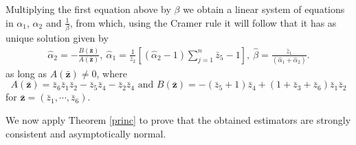 \documentclass[lineno]{biometrika}
\newcommand{\bs}{\boldsymbol}
\begin{document}
Multiplying the first equation above by $\beta$ we obtain a linear system of equations in $\alpha_1$, $\alpha_2$ and $\frac{1}{\beta}$, from which, using the Cramer rule it will follow that it has as unique solution given by
\begin{align*}
\hat{\alpha}_2 = -\frac{B(\bs{\bar{z}})}{A(\bs{\bar{z}})}, \
\hat{\alpha}_1 = \frac{1}{\bar{z}_2} \left[ (\hat{\alpha}_2 - 1) \sum_{j=1}^{n} \bar{z}_5 - 1 \right], \
\hat{\beta} = \frac{\bar{z}_1}{ (\hat{\alpha}_1 + \hat{\alpha}_2)}.
\end{align*}
as long as $A(\bs{\bar{z}})\neq 0$, where
\begin{equation*}A(\bs{\bar{z}})=\bar{z}_6\bar{z}_1\bar{z}_2-\bar{z}_5\bar{z}_4-\bar{z}_2\bar{z}_4\mbox{ and }B(\bs{\bar{z}}) = -(\bar{z}_5+1)\bar{z}_4 + (1+\bar{z}_3+\bar{z}_6)\bar{z}_1\bar{z}_2
\end{equation*}
for $\bs{\bar{z}}=\left(\bar{z}_1,\cdots,\bar{z}_6\right)$.

We now apply Theorem \ref{princ} to prove that the obtained estimators are strongly consistent and asymptotically normal.
\end{document}
